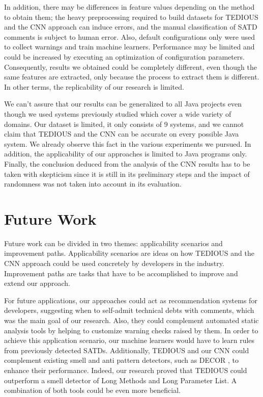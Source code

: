 In addition, there may be differences in feature values depending on the method to obtain them; the heavy preprocessing required to build datasets for TEDIOUS and the CNN approach can induce errors, and the manual classification of SATD comments is subject to human error. Also, default configurations only were used to collect warnings and train machine learners. Performance may be limited and could be increased by executing an optimization of configuration parameters. Consequently, results we obtained could be completely different, even though the same features are extracted, only because the process to extract them is different. In other terms, the replicability of our research is limited.

We can't assure that our results can be generalized to all Java projects even though we used systems previously studied \citep{maldonado17} which cover a wide variety of domains. Our dataset is limited, it only consists of 9 systems, and we cannot claim that TEDIOUS and the CNN can be accurate on every possible Java system. We already observe this fact in the various experiments we pursued. In addition, the applicability of our approaches is limited to Java programs only. Finally, the conclusion deduced from the analysis of the CNN results has to be taken with skepticism since it is still in its preliminary steps and the impact of randomness was not taken into account in its evaluation.

\section{Future Work}


Future work can be divided in two themes: applicability scenarios and improvement paths. Applicability scenarios are ideas on how TEDIOUS and the CNN approach could be used concretely by developers in the industry. Improvement paths are tasks that have to be accomplished to improve and extend our approach.

For future applications, our approaches could act as recommendation systems for developers, suggesting when to self-admit technical debts with comments, which was the main goal of our research. Also, they could complement automated static analysis tools by helping to customize warning checks raised by them. In order to achieve this application scenario, our machine learners would have to learn rules from previously detected SATDs. Additionally, TEDIOUS and our CNN could complement existing smell and anti pattern detectors, such as DECOR \citep{moha2010decor}, to enhance their performance. Indeed, our research proved that TEDIOUS could outperform a smell detector of Long Methods and Long Parameter List. A combination of both tools could be even more beneficial.

